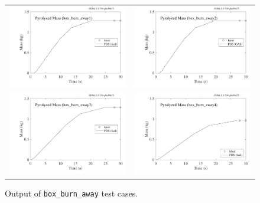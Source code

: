 \documentclass[11pt]{book}
\newcommand{\ct}{\tt\small}
\begin{document}
\begin{figure}[ht]
\begin{tabular*}{\textwidth}{lr}
\includegraphics[width=3.2in]{SCRIPT_FIGURES/box_burn_away1} &
\includegraphics[width=3.2in]{SCRIPT_FIGURES/box_burn_away2} \\
\includegraphics[width=3.2in]{SCRIPT_FIGURES/box_burn_away3} &
\includegraphics[width=3.2in]{SCRIPT_FIGURES/box_burn_away4}
\end{tabular*}
\caption[Results of the {\ct box\_burn\_away} test cases]{Output of {\ct box\_burn\_away} test cases.}
\label{box_burn_away}
\end{figure}
\end{document}
